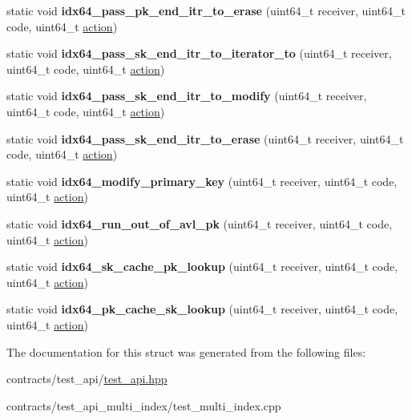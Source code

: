 \begin{DoxyCompactItemize}
\item 
\mbox{\label{structtest__multi__index_aab716b7c1bc320466e0a97783e1cfcbf}} 
static void {\bfseries idx64\+\_\+pass\+\_\+pk\+\_\+end\+\_\+itr\+\_\+to\+\_\+erase} (uint64\+\_\+t receiver, uint64\+\_\+t code, uint64\+\_\+t \mbox{\hyperlink{structaacio_1_1action}{action}})
\item 
\mbox{\label{structtest__multi__index_aea24c7dcec87e0f8f0f7d6ba67eb54fd}} 
static void {\bfseries idx64\+\_\+pass\+\_\+sk\+\_\+end\+\_\+itr\+\_\+to\+\_\+iterator\+\_\+to} (uint64\+\_\+t receiver, uint64\+\_\+t code, uint64\+\_\+t \mbox{\hyperlink{structaacio_1_1action}{action}})
\item 
\mbox{\label{structtest__multi__index_a056000c82515fc484752686464c1b4a5}} 
static void {\bfseries idx64\+\_\+pass\+\_\+sk\+\_\+end\+\_\+itr\+\_\+to\+\_\+modify} (uint64\+\_\+t receiver, uint64\+\_\+t code, uint64\+\_\+t \mbox{\hyperlink{structaacio_1_1action}{action}})
\item 
\mbox{\label{structtest__multi__index_a4be47b9c88c88fca940fd99aeebd7b9b}} 
static void {\bfseries idx64\+\_\+pass\+\_\+sk\+\_\+end\+\_\+itr\+\_\+to\+\_\+erase} (uint64\+\_\+t receiver, uint64\+\_\+t code, uint64\+\_\+t \mbox{\hyperlink{structaacio_1_1action}{action}})
\item 
\mbox{\label{structtest__multi__index_a509b0f3f96bc7ed0227e8f719e38fb5d}} 
static void {\bfseries idx64\+\_\+modify\+\_\+primary\+\_\+key} (uint64\+\_\+t receiver, uint64\+\_\+t code, uint64\+\_\+t \mbox{\hyperlink{structaacio_1_1action}{action}})
\item 
\mbox{\label{structtest__multi__index_a6de45f9d31744a085554aa59a7f2dc68}} 
static void {\bfseries idx64\+\_\+run\+\_\+out\+\_\+of\+\_\+avl\+\_\+pk} (uint64\+\_\+t receiver, uint64\+\_\+t code, uint64\+\_\+t \mbox{\hyperlink{structaacio_1_1action}{action}})
\item 
\mbox{\label{structtest__multi__index_a5e6a450269d5f3c405d4748f3d9675f7}} 
static void {\bfseries idx64\+\_\+sk\+\_\+cache\+\_\+pk\+\_\+lookup} (uint64\+\_\+t receiver, uint64\+\_\+t code, uint64\+\_\+t \mbox{\hyperlink{structaacio_1_1action}{action}})
\item 
\mbox{\label{structtest__multi__index_a9eeee83a1a172a975e924078aa0e2a58}} 
static void {\bfseries idx64\+\_\+pk\+\_\+cache\+\_\+sk\+\_\+lookup} (uint64\+\_\+t receiver, uint64\+\_\+t code, uint64\+\_\+t \mbox{\hyperlink{structaacio_1_1action}{action}})
\end{DoxyCompactItemize}


The documentation for this struct was generated from the following files\+:\begin{DoxyCompactItemize}
\item 
contracts/test\+\_\+api/\mbox{\hyperlink{test__api_8hpp}{test\+\_\+api.\+hpp}}\item 
contracts/test\+\_\+api\+\_\+multi\+\_\+index/test\+\_\+multi\+\_\+index.\+cpp\end{DoxyCompactItemize}
